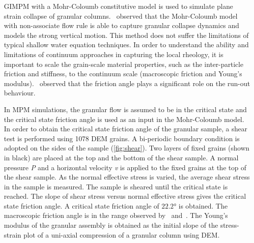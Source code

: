 GIMPM with a Mohr-Coloumb constitutive model is used to simulate plane strain 
collapse of granular columns.~\citet{Crosta2009} observed that the Mohr-Coloumb 
model with non-associate flow rule is able to capture granular collapse 
dynamics and models the strong vertical motion. This method does not suffer 
the limitations of typical shallow water equation techniques. In order to 
understand the ability and limitations of continuum approaches in capturing the 
local rheology, it is important to scale the grain-scale material properties, 
such as the inter-particle friction and stiffness, to the continuum scale 
(macroscopic friction and Young's modulus).~\citet{Crosta2009} observed that 
the friction angle plays a significant role on the run-out behaviour. 

In MPM simulations, the granular flow is assumed to be in the critical state 
and the critical state friction angle is used as an input in the Mohr-Coloumb 
model. In order to obtain the critical state friction angle of the granular 
sample, a shear test is performed using 1078 DEM grains. A bi-periodic boundary 
condition is adopted on the sides of the sample (\cref{fig:shear}). Two layers 
of fixed grains (shown in black) are placed at the top and the bottom of the 
shear sample. A normal pressure \textit{P} and a horizontal velocity \textit{v} 
is applied to the fixed grains  at the top of the shear sample. As the normal 
effective stress is varied, the average shear stress in the sample is measured. 
The sample is sheared until the critical state is reached. The slope of shear 
stress versus normal effective stress gives the critical state friction angle. 
A critical state friction angle of $22.2$\si{\degree} is obtained. The 
macroscopic friction angle is in the range observed by~\citet{Estrada2008} 
and~\citet{Mitchell2005}. The Young's modulus of the granular assembly is 
obtained as the initial slope of the stress-strain plot of a uni-axial 
compression of a granular column using DEM.

